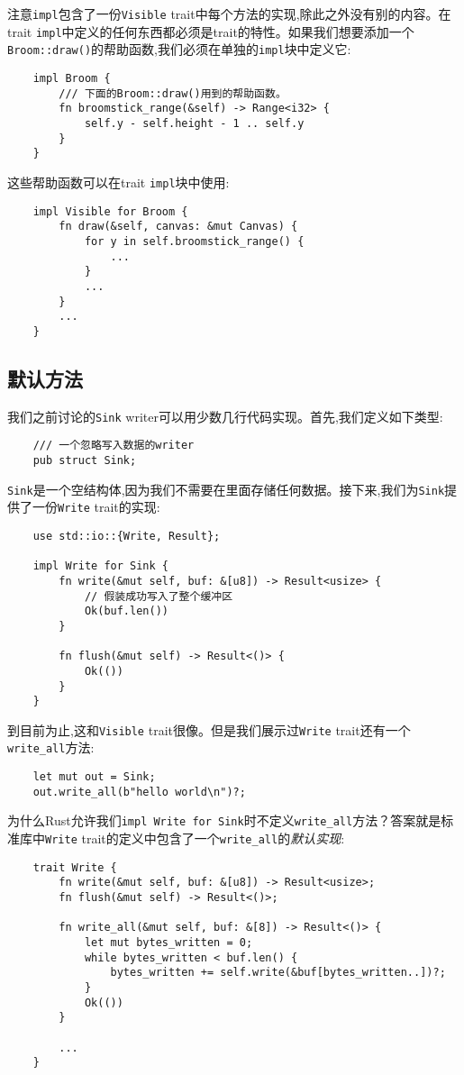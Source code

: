 注意\texttt{impl}包含了一份\texttt{Visible} trait中每个方法的实现,除此之外没有别的内容。在trait \texttt{impl}中定义的任何东西都必须是trait的特性。如果我们想要添加一个\texttt{Broom::draw()}的帮助函数,我们必须在单独的\texttt{impl}块中定义它:

\begin{verbatim}
    impl Broom {
        /// 下面的Broom::draw()用到的帮助函数。
        fn broomstick_range(&self) -> Range<i32> {
            self.y - self.height - 1 .. self.y
        }
    }
\end{verbatim}

这些帮助函数可以在trait \texttt{impl}块中使用:
\begin{verbatim}
    impl Visible for Broom {
        fn draw(&self, canvas: &mut Canvas) {
            for y in self.broomstick_range() {
                ...
            }
            ...
        }
        ...
    }
\end{verbatim}

\subsection{默认方法}
我们之前讨论的\texttt{Sink} writer可以用少数几行代码实现。首先,我们定义如下类型:
\begin{verbatim}
    /// 一个忽略写入数据的writer
    pub struct Sink;
\end{verbatim}

\texttt{Sink}是一个空结构体,因为我们不需要在里面存储任何数据。接下来,我们为\texttt{Sink}提供了一份\texttt{Write} trait的实现:
\begin{verbatim}
    use std::io::{Write, Result};

    impl Write for Sink {
        fn write(&mut self, buf: &[u8]) -> Result<usize> {
            // 假装成功写入了整个缓冲区
            Ok(buf.len())
        }

        fn flush(&mut self) -> Result<()> {
            Ok(())
        }
    }
\end{verbatim}

到目前为止,这和\texttt{Visible} trait很像。但是我们展示过\texttt{Write} trait还有一个\texttt{write\_all}方法:
\begin{verbatim}
    let mut out = Sink;
    out.write_all(b"hello world\n")?;
\end{verbatim}

为什么Rust允许我们\texttt{impl Write for Sink}时不定义\texttt{write\_all}方法？答案就是标准库中\texttt{Write} trait的定义中包含了一个\texttt{write\_all}的\emph{默认实现}:
\begin{verbatim}
    trait Write {
        fn write(&mut self, buf: &[u8]) -> Result<usize>;
        fn flush(&mut self) -> Result<()>;
        
        fn write_all(&mut self, buf: &[8]) -> Result<()> {
            let mut bytes_written = 0;
            while bytes_written < buf.len() {
                bytes_written += self.write(&buf[bytes_written..])?;
            }
            Ok(())            
        }

        ...
    }
\end{verbatim}

